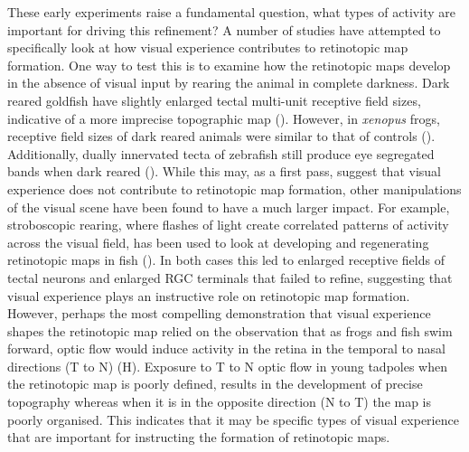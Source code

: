 These early experiments raise a fundamental  question, what types of activity are important for driving this refinement? A number of studies have attempted to specifically look at how visual experience contributes to retinotopic map formation. One way to test this is to examine how the retinotopic maps develop in the absence of visual input by rearing the animal in complete darkness. Dark reared goldfish have slightly enlarged tectal multi-unit receptive field sizes, indicative of a more imprecise topographic map (\cite{Schmidt1985StroboscopicGoldfish}). However, in \textit{xenopus} frogs, receptive field sizes of dark reared animals were similar to that of controls (\cite{Keating1986VisualLaevis}). Additionally, dually innervated tecta of zebrafish still produce eye segregated bands when dark reared (\cite{Ramdya2008EmergenceCircuit}). While this may, as a first pass, suggest that visual experience does not contribute to retinotopic map formation, other manipulations of the visual scene have been found to have a much larger impact. For example, stroboscopic rearing, where flashes of light create correlated patterns of activity across the visual field, has been used to look at developing and regenerating retinotopic maps in fish (\cite{Schmidt1993ActivitydrivenSharpening, Schmidt1985StroboscopicGoldfish}). In both cases this led to enlarged receptive fields of tectal neurons and enlarged RGC terminals that failed to refine, suggesting that visual experience plays an instructive role on retinotopic map formation. However, perhaps the most compelling demonstration that visual experience shapes the retinotopic map relied on the observation that as frogs and fish swim forward, optic flow would induce activity in the retina in the temporal to nasal directions (T to N) (H\cite{Hiramoto2014OpticInformation}). Exposure to T to N optic flow in young tadpoles when the retinotopic map is poorly defined, results in the development of precise topography whereas when it is in the opposite direction (N to T) the map is poorly organised. This indicates that it may be specific types of visual experience that are important for instructing the formation of retinotopic maps.

